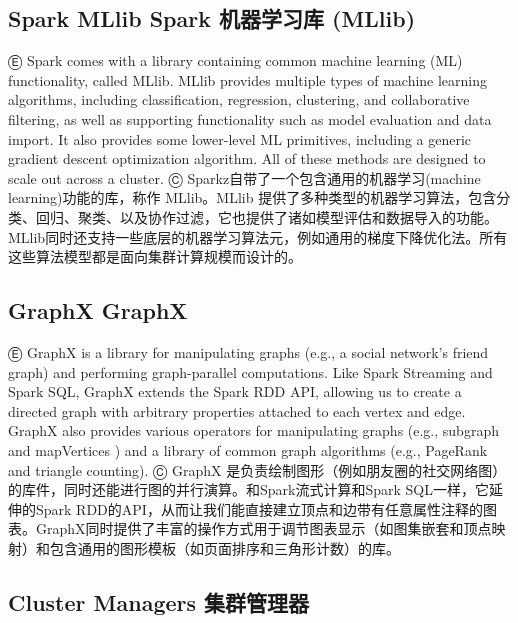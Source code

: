 \subsection{Spark MLlib \textbar{}\textbar{} Spark 机器学习库
(MLlib)}\label{spark-mllib-spark-ux673aux5668ux5b66ux4e60ux5e93-mllib}

Ⓔ Spark comes with a library containing common machine learning (ML)
functionality, called MLlib. MLlib provides multiple types of machine
learning algorithms, including classification, regression, clustering,
and collaborative filtering, as well as supporting functionality such as
model evaluation and data import. It also provides some lower-level ML
primitives, including a generic gradient descent optimization algorithm.
All of these methods are designed to scale out across a cluster. Ⓒ
Sparkz自带了一个包含通用的机器学习(machine learning)功能的库，称作
MLlib。MLlib
提供了多种类型的机器学习算法，包含分类、回归、聚类、以及协作过滤，它也提供了诸如模型评估和数据导入的功能。MLlib同时还支持一些底层的机器学习算法元，例如通用的梯度下降优化法。所有这些算法模型都是面向集群计算规模而设计的。

\subsection{GraphX \textbar{}\textbar{} GraphX}\label{graphx-graphx}

Ⓔ GraphX is a library for manipulating graphs (e.g., a social network's
friend graph) and performing graph-parallel computations. Like Spark
Streaming and Spark SQL, GraphX extends the Spark RDD API, allowing us
to create a directed graph with arbitrary properties attached to each
vertex and edge. GraphX also provides various operators for manipulating
graphs (e.g., subgraph and mapVertices ) and a library of common graph
algorithms (e.g., PageRank and triangle counting). Ⓒ GraphX
是负责绘制图形（例如朋友圈的社交网络图）的库件，同时还能进行图的并行演算。和Spark流式计算和Spark
SQL一样，它延伸的Spark
RDD的API，从而让我们能直接建立顶点和边带有任意属性注释的图表。GraphX同时提供了丰富的操作方式用于调节图表显示（如图集嵌套和顶点映射）和包含通用的图形模板（如页面排序和三角形计数）的库。

\subsection{Cluster Managers \textbar{}\textbar{}
集群管理器}\label{cluster-managers-ux96c6ux7fa4ux7ba1ux7406ux5668}

